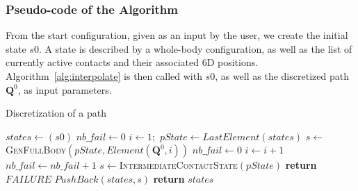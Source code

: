 \subsubsection{Pseudo-code of the Algorithm}
\label{app:contact}



From the start configuration, given as an input by the user,
we create the initial state $s0$. A state is described by a whole-body configuration, as well as the list of currently active contacts and their associated 6D positions.
Algorithm~\ref{alg:interpolate}  is then called with $s0$, as well as the discretized path 
$\mathbf{Q}^0$, as input parameters.

\begin{algorithm}[!tbp]
\caption{Discretization of a path} \label{interpolate}
	\begin{algorithmic}[1]
		\State $states \gets (s0)$ 
		\State $nb\_fail \gets 0$ 
		\State $i \gets 1;$ 
			\State $pState \gets LastElement(states)$
			\State $s \gets$ \textsc{GenFullBody}$(pState, Element(\mathbf{Q}^0,i))$
				\State $nb\_fail \gets 0$
				\State $i \gets i+1$
			\Else
				\State $nb\_fail \gets nb\_fail + 1$
				\State $s \gets $\textsc{IntermediateContactState}$(pState)$
					\State \textbf{return} $FAILURE$
				\EndIf		
			\EndIf
			\State ${PushBack}(states, s)$
		\EndWhile
		\State \textbf{return} $states$
	\EndFunction
\end{algorithmic}
\label{alg:interpolate}
\end{algorithm}


